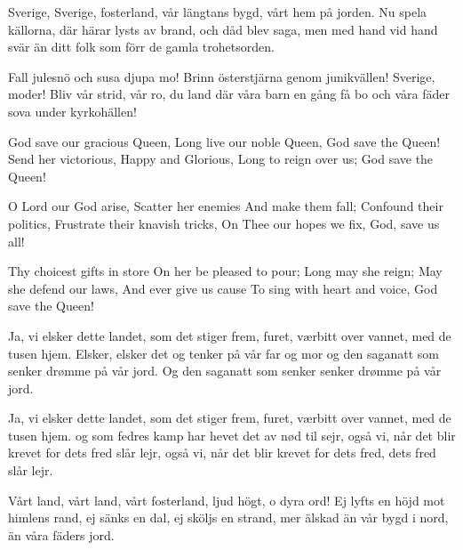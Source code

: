 \author{Text: }
\tags{}

\songtext{}Sverige, Sverige, fosterland,
vår längtans bygd, vårt hem på jorden.
Nu spela källorna, där härar lysts av brand,
och dåd blev saga, men med hand vid hand
svär än ditt folk som förr de gamla trohetsorden.

Fall julesnö och susa djupa mo!
Brinn österstjärna genom junikvällen!
Sverige, moder! Bliv vår strid, vår ro,
du land där våra barn en gång få bo
och våra fäder sova under kyrkohällen!




\songtext{} God save our gracious Queen,
Long live our noble Queen,
God save the Queen!
Send her victorious,
Happy and Glorious,
Long to reign over us;
God save the Queen!

O Lord our God arise,
Scatter her enemies
And make them fall;
Confound their politics,
Frustrate their knavish tricks,
On Thee our hopes we fix,
God, save us all!

Thy choicest gifts in store
On her be pleased to pour;
Long may she reign;
May she defend our laws,
And ever give us cause
To sing with heart and voice,
God save the Queen! 






\songtext{}Ja, vi elsker dette landet,
som det stiger frem,
furet, værbitt over vannet,
med de tusen hjem.
Elsker, elsker det og tenker
på vår far og mor
og den saganatt som senker
drømme på vår jord.
Og den saganatt som senker
senker drømme på vår jord.

Ja, vi elsker dette landet,
som det stiger frem,
furet, værbitt over vannet,
med de tusen hjem.
og som fedres kamp har hevet
det av nød til sejr,
også vi, når det blir krevet
for dets fred slår lejr,
også vi, når det blir krevet
for dets fred, dets fred slår lejr.





\songtext{}Vårt land, vårt land, vårt fosterland,
ljud högt, o dyra ord!
Ej lyfts en höjd mot himlens rand,
ej sänks en dal, ej sköljs en strand,
mer älskad än vår bygd i nord,
än våra fäders jord.


